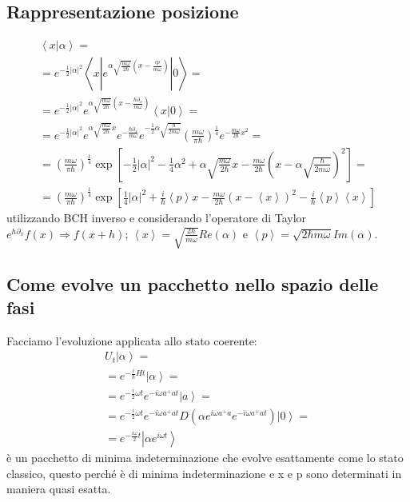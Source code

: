 \subsection{Rappresentazione posizione} %
\begin{equation}\begin{split}
\left\langle x|\alpha \right\rangle=\\
=e^{-\frac{1}{2}|\alpha|^2}\left\langle x|e^{\alpha\sqrt{\frac{m\omega }{2\hbar}}\left(x-\frac{ip}{m\omega }\right)}|0 \right\rangle=\\
=e^{-\frac{1}{2}|\alpha|^2}e^{\alpha\sqrt{\frac{m\omega }{2\hbar}}\left(x-\frac{\hbar \partial _x}{m\omega }\right)}\left\langle x|0 \right\rangle=\\
=e^{-\frac{1}{2}|\alpha|^2}e^{\alpha\sqrt{\frac{m\omega }{2\hbar}}x}e^{-\frac{\hbar \partial _x}{m\omega }}e^{-\frac{1}{2}\alpha\sqrt{\frac{\hbar }{2m\omega }}}\left(\frac{m\omega }{\pi \hbar }\right)^{\frac{1}{4}}e^{-\frac{m\omega }{2\hbar }x^2}=\\
=\left(\frac{m\omega }{\pi \hbar }\right)^{\frac{1}{4}}\exp{\left[-\frac{1}{2}|\alpha|^2-\frac{1}{4}\alpha^2+\alpha\sqrt{\frac{m\omega }{2\hbar }}x-\frac{m\omega }{2\hbar }\left(x-\alpha\sqrt{\frac{\hbar }{2m\omega }}\right)^2\right]}=\\
=\left(\frac{m\omega }{\pi \hbar }\right)^{\frac{1}{4}}\exp{\left[\frac{1}{4}|\alpha|^2+\frac{i}{\hbar }\left\langle p \right\rangle x-\frac{m\omega }{2\hbar }\left(x-\left\langle x \right\rangle\right)^2-\frac{i}{\hbar }\left\langle p \right\rangle\left\langle x \right\rangle\right]}
\end{split}\end{equation}
utilizzando BCH inverso e considerando l'operatore di Taylor $e^{h\partial _x}f\left(x\right)\Longrightarrow f\left(x+h\right)$; $\left\langle x \right\rangle=\sqrt{\frac{2\hbar }{m\omega }}Re(\alpha)$ e $\left\langle p \right\rangle=\sqrt{2\hbar m\omega }Im(\alpha)$.

\subsection{Come evolve un pacchetto nello spazio delle fasi} %
Facciamo l'evoluzione applicata allo stato coerente:
\begin{equation}\begin{split}
U_t\left |\alpha \right\rangle=\\
=e^{-\frac{i}{\hbar}Ht}\left |\alpha \right\rangle =\\
=e^{-\frac{i}{2}\omega t} e^{-i\omega a^+at}\left |a \right\rangle=\\
=e^{-\frac{i}{2}\omega t} e^{-i\omega a^+at}D(\alpha e^{i\omega a^+a}e^{-i\omega a^+at})\left |0 \right\rangle =\\
=e^{-\frac{i\omega }{2}t}\left |\alpha e^{i\omega t} \right\rangle
\end{split}\end{equation}
è un pacchetto di minima indeterminazione che evolve esattamente come lo stato classico, questo perché è di minima indeterminazione e x e p sono determinati in maniera quasi esatta.
%